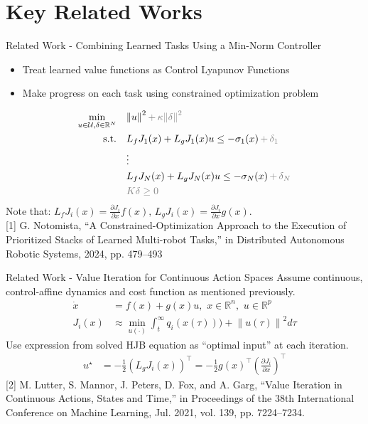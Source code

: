 \section{Key Related Works}

\begin{frame}{Related Work - Combining Learned Tasks Using a Min-Norm Controller}
	\begin{itemize}
		\item{Treat learned value functions as Control Lyapunov Functions}
		\item{Make progress on each task using constrained optimization problem}
	\end{itemize}
	\begin{align*}
		\min_{u \in \mathcal{U}, \delta \in \mathbb{R}^N} \quad & { \lVert u \rVert }^2 \, { \color{gray} + \, \kappa { \lVert \delta \rVert }^2 } \\
		\textrm{s.t.} \quad & L_f {J}_1 (x) + L_g {J}_1 (x) u \le - \sigma_1(x) \, {\color{gray} + \, \delta_1 } \\
                \quad & \vdots \\
		\quad & L_f {J}_N (x) + L_g {J}_N (x) u \le - \sigma_N(x) \, {\color{gray} + \, \delta_N } \\
		\quad & { \color{gray} K \delta \ge 0 }
	\end{align*}
        Note that: $L_f {J}_i(x) = \frac{\partial {J}_i}{\partial x} f(x), \, L_g {J}_i(x) = \frac{\partial {J}_i}{\partial x} g(x)$.\\
	\seprule
	\footnotesize{[1] G. Notomista, “A Constrained-Optimization Approach to the Execution of Prioritized Stacks of Learned Multi-robot Tasks,” in Distributed Autonomous Robotic Systems, 2024, pp. 479–493}
\end{frame}

\begin{frame}{Related Work - Value Iteration for Continuous Action Spaces}
	Assume continuous, control-affine dynamics and cost function as mentioned previously.
	\begin{align*}
		\dot{x} &= f(x) + g(x)u, \,\, x \in \mathbb{R}^n, \,\, u \in \mathbb{R}^p \\
		J_i (x) &\approx \min_{u(\cdot)} \int_t^{\infty} q_i(x(\tau))) + {\lVert u(\tau) \rVert}^2 d \tau
	\end{align*}
	Use expression from solved HJB equation as ``optimal input'' at each iteration.
	\begin{align*}
		u^{\star} &= - \frac{1}{2} ( L_g {J}_i (x) )^{\top} = - \frac{1}{2} g(x)^{\top} \left( \frac{\partial {J}_i}{\partial x} \right)^{\top}
	\end{align*}
	\seprule
	\footnotesize{[2] M. Lutter, S. Mannor, J. Peters, D. Fox, and A. Garg, “Value Iteration in Continuous Actions, States and Time,” in Proceedings of the 38th International Conference on Machine Learning, Jul. 2021, vol. 139, pp. 7224–7234.}
\end{frame}


